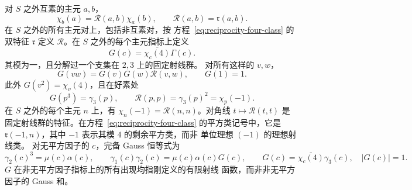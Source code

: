 \begin{lemma}
\label{lem:fixed-gauss-phase}
对 $S$ 之外互素的主元 $a,b$，
\[
 \chi_b(a)=\mathcal R(a,b)\chi_a(b),\qquad
 \mathcal R(a,b)=\mathfrak r(a,b).
\]
在 $S$ 之外的所有主元对上，包括非互素对，按
方程~\eqref{eq:reciprocity-four-class} 的双特征 $\mathfrak r$
定义 $\mathcal R$。在 $S$ 之外的每个主元指标上定义
\[
 G(c)=\overline{\chi_c(4)}\Gamma(c).
\]
其模为一，且分解过一个支集在 $2,3$ 上的固定射线群。
对所有这样的 $v,w$，
\begin{equation}\label{eq:G-quadratic-refinement}
 G(vw)=G(v)G(w)\mathcal R(v,w),\qquad G(1)=1.
\end{equation}
此外 $G(v^2)=\chi_v(4)$，且在好素处
\begin{equation}\label{eq:fixed-gauss-phases}
 G(p^3)=\gamma_3(p),\qquad
 \mathcal R(p,p)=\gamma_3(p)^2=\chi_p(-1).
\end{equation}
在 $S$ 之外的每个主元 $n$ 上，有
$\chi_n(-1)=\mathcal R(n,n)$。对角线 $t\mapsto\mathcal R(t,t)$ 是
固定射线群的特征。在方程~\eqref{eq:reciprocity-four-class}
的平方类记号中，它是 $\mathfrak r(-1,n)$，其中
$-1$ 表示其模 $4$ 的剩余平方类，而非
单位理想 $(-1)$ 的理想射线类。
对无平方因子的 $c$，完备 Gauss 恒等式为
\begin{equation}\label{eq:signal}
 \gamma_2(c)^3=\mu(c)\alpha(c),\qquad
 \gamma_1(c)\gamma_2(c)=\mu(c)\alpha(c)G(c),\qquad
 G(c)=\overline{\chi_c(4)}\gamma_3(c),\quad |G(c)|=1.
\end{equation}
$G$ 在非无平方因子指标上的所有出现均指刚定义的有限射线
函数，而非非无平方因子的 Gauss 和。
\end{lemma}

